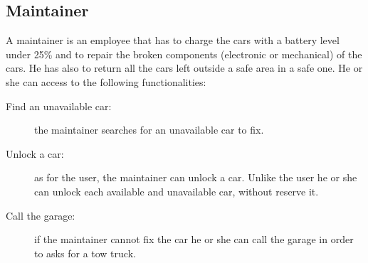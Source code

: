 \subsection{Maintainer}
A maintainer is an employee that has to charge the cars with a battery level under 25\% and to repair the broken components (electronic or mechanical) of the cars. He has also to return all the cars left outside a safe area in a safe one. He or she can access to the following functionalities:
\begin{description}
\item[Find an unavailable car:] the maintainer searches for an unavailable car to fix.
\item[Unlock a car:] as for the user, the maintainer can unlock a car. Unlike the user he or she can unlock each available and unavailable car, without reserve it.
\item[Call the garage:] if the maintainer cannot fix the car he or she can call the garage in order to asks for a tow truck.
\end{description}
